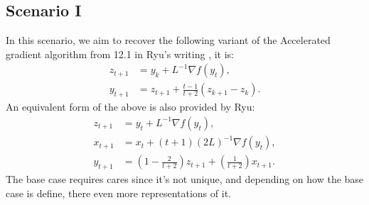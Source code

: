 \documentclass[12pt]{article}
\begin{document}
    \subsection{Scenario I}
        In this scenario, we aim to recover the following variant of the Accelerated gradient algorithm from 12.1 in Ryu's writing \cite{ryu_large-scale_2022}, it is: 
        \begin{align*}
            z_{t + 1} &= y_k + L^{-1}\nabla f(y_t), 
            \\
            y_{t + 1} &= z_{t + 1} + \frac{t - 1}{t + 2}\left(
                z_{k + 1} - z_k
            \right). 
        \end{align*}
        An equivalent form of the above is also provided by Ryu: 
        \begin{align*}
            z_{t + 1} &= y_t + L^{-1}\nabla f(y_t), 
            \\
            x_{t + 1} &= x_t + (t + 1)(2L)^{-1}\nabla f(y_t), 
            \\
            y_{t + 1} &= \left(
                1 - \frac{2}{t + 2} 
            \right)z_{t + 1} + 
            \left(
                \frac{1}{t + 2}
            \right)x_{t + 1}. 
        \end{align*}
        The base case requires cares since it's not unique, and depending on how the base case is define, there even more representations of it. 
\end{document}
